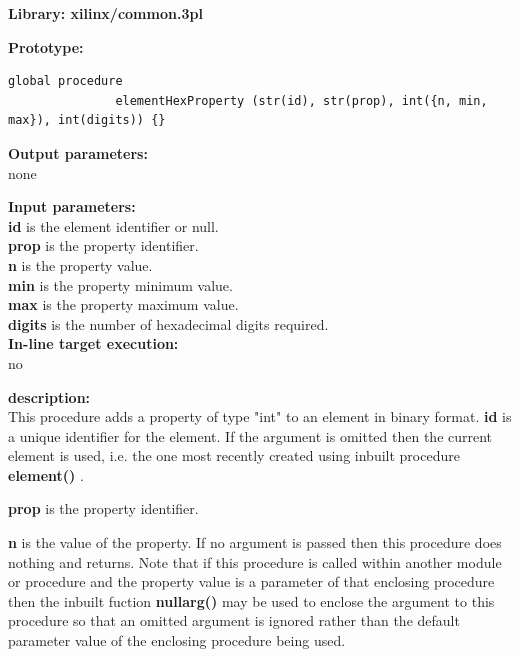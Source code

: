             {\bf Library: xilinx/common.3pl}

            {\bf Prototype:} \\
            \vsp
            \begin{lstlisting}[gobble=12, language=threepl]
               global procedure
               elementHexProperty (str(id), str(prop), int({n, min, max}), int(digits)) {}
            \end{lstlisting}

            {\bf Output parameters:} \\
            none

            {\bf Input parameters:} \\            
            {\bf id} is the element identifier or null.\\
            {\bf prop} is the property identifier.\\
            {\bf n} is the property value.\\
            {\bf min} is the property minimum value.\\
            {\bf max} is the property maximum value.\\
            {\bf digits} is the number of hexadecimal digits required.\\
        
            {\bf In-line target execution:} \\
            no

            {\bf description:} \\
            This procedure adds a property of type "int" to an element in
            binary format.
            {\bf id} is a unique identifier for the element. If the argument is
            omitted then the current element is used, i.e. the one most recently
            created using inbuilt procedure {\bf element()} .
            
            {\bf prop} is the property identifier.
            
            {\bf n} is the value of the property. If no argument is passed then
            this procedure does nothing and returns. Note that if this procedure
            is called within another module or procedure and the property
            value is a parameter of that enclosing procedure then the inbuilt
            fuction {\bf nullarg()}  may be used to enclose the
            argument to this procedure so that an omitted argument is ignored rather
            than the default parameter value of the enclosing procedure being used.
            
